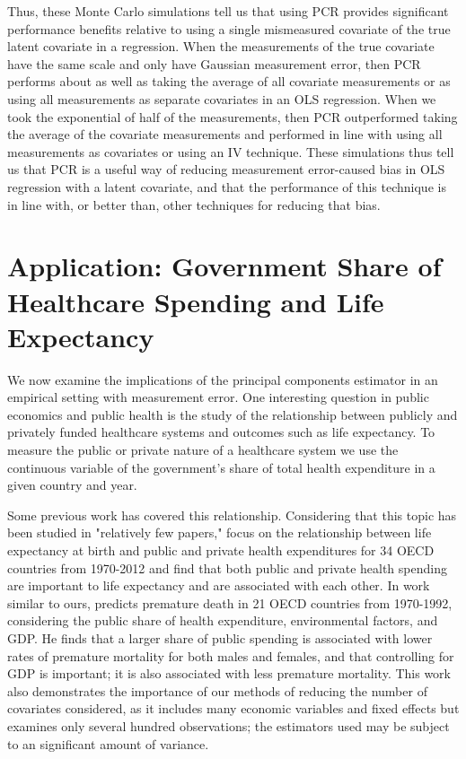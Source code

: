 \documentclass[10pt]{article}
\begin{document}
Thus, these Monte Carlo simulations tell us that using PCR provides significant performance benefits relative to using a single mismeasured covariate of the true latent covariate in a regression. When the measurements of the true covariate have the same scale and only have Gaussian measurement error, then PCR performs about as well as taking the average of all covariate measurements or as using all measurements as separate covariates in an OLS regression. When we took the exponential of half of the measurements, then PCR outperformed taking the average of the covariate measurements and performed in line with using all measurements as covariates or using an IV technique. These simulations thus tell us that PCR is a useful way of reducing measurement error-caused bias in OLS regression with a latent covariate, and that the performance of this technique is in line with, or better than, other techniques for reducing that bias.

    \section*{Application: Government Share of Healthcare Spending and Life Expectancy}

        We now examine the implications of the principal components estimator in an empirical setting with measurement error. One interesting question in public economics and public health is the study of the relationship between publicly and privately funded healthcare systems and outcomes such as life expectancy. To measure the public or private nature of a healthcare system we use the continuous variable of the government's share of total health expenditure in a given country and year.

        Some previous work has covered this relationship. Considering that this topic has been studied in "relatively few papers," \cite{linden_life_2017} focus on the relationship between life expectancy at birth and public and private health expenditures for 34 OECD countries from 1970-2012 and find that both public and private health spending are important to life expectancy and are associated with each other. In work similar to ours, \cite{or_determinants_2000} predicts premature death in 21 OECD countries from 1970-1992, considering the public share of health expenditure, environmental factors, and GDP. He finds that a larger share of public spending is associated with lower rates of premature mortality for both males and females, and that controlling for GDP is important; it is also associated with less premature mortality. This work also demonstrates the importance of our methods of reducing the number of covariates considered, as it includes many economic variables and fixed effects but examines only several hundred observations; the estimators used may be subject to an significant amount of variance.
\end{document}
